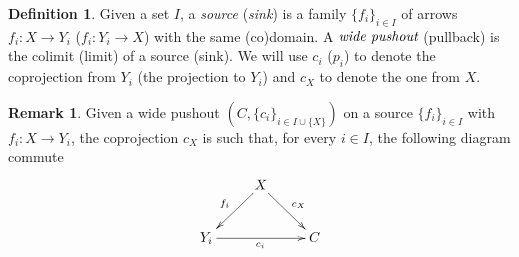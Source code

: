 \documentclass[a4paper]{article}
\theoremstyle{definition}
\newtheorem{definition}[theorem]{Definition}
\newtheorem{remark}[theorem]{Remark}
\begin{document}
\begin{definition}    
	Given a set $I$, a  \emph{source}  (\emph{sink}) is a family $\{f_i\}_{i\in I}$ of arrows  $f_i\colon X\to Y_i$ ($f_i\colon Y_i\to X$) with the same (co)domain. A $\emph{wide pushout}$ (pullback) is the colimit (limit) of a source (sink). We will use $c_i$ ($p_i$) to denote the coprojection from $Y_i$ (the projection to $Y_i$) and $c_X$ to denote the one from $X$.
\end{definition}

\begin{remark}\label{rem:copro}
	Given a wide pushout $(C, \{c_i\}_{i\in I\cup \{X\}})$ on a source $\{f_i\}_{i\in I}$ with $f_i\colon X\to Y_i$, the coprojection $c_X$ is such that, for every $i\in I$, the following diagram commute
	\[\xymatrix{&X\ar[dl]_{f_i} \ar[dr]^{c_X}\\
		Y_i\ar[rr]_{c_{i}} && C}\]
\end{remark}
\end{document}
